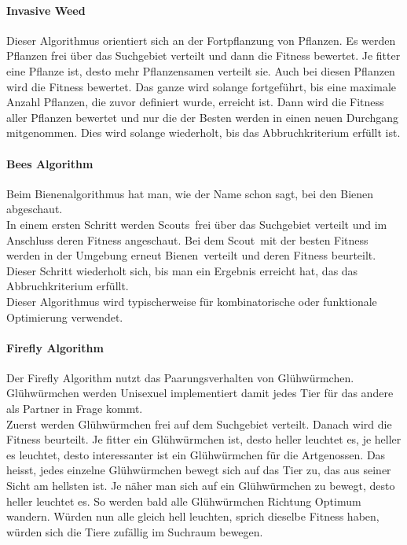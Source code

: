 		\paragraph{Invasive Weed}
		$\;$ \\
		Dieser Algorithmus orientiert sich an der Fortpflanzung von Pflanzen. Es werden Pflanzen frei über das Suchgebiet verteilt und dann die Fitness bewertet. Je fitter eine Pflanze ist, desto mehr Pflanzensamen verteilt sie. Auch bei diesen Pflanzen wird die Fitness bewertet. Das ganze wird solange fortgeführt, bis eine maximale Anzahl Pflanzen, die zuvor definiert wurde, erreicht ist. Dann wird die Fitness aller Pflanzen bewertet und nur die der Besten werden in einen neuen Durchgang mitgenommen. Dies wird solange wiederholt, bis das Abbruchkriterium erfüllt ist.
				
		
		\paragraph{Bees Algorithm}
		$\;$ \\
		Beim Bienenalgorithmus hat man, wie der Name schon sagt, bei den Bienen abgeschaut.\\
		In einem ersten Schritt werden \textacutedbl Scouts\textacutedbl \ frei über das Suchgebiet verteilt und im Anschluss deren Fitness angeschaut. Bei dem \textacutedbl Scout\textacutedbl \ mit der besten Fitness werden in der Umgebung erneut \textacutedbl Bienen\textacutedbl \ verteilt und deren Fitness beurteilt. Dieser Schritt wiederholt sich, bis man ein Ergebnis erreicht hat, das das Abbruchkriterium erfüllt.\\Dieser Algorithmus wird typischerweise für kombinatorische oder funktionale Optimierung verwendet.
		
		\paragraph{Firefly Algorithm} 
		$\;$ \\
		Der Firefly Algorithm nutzt das Paarungsverhalten von Glühwürmchen. Glühwürmchen werden Unisexuel implementiert damit jedes Tier für das andere als Partner in Frage kommt. \\
		Zuerst werden Glühwürmchen frei auf dem Suchgebiet verteilt. Danach wird die Fitness beurteilt. Je fitter ein Glühwürmchen ist, desto heller leuchtet es, je heller es leuchtet, desto interessanter ist ein Glühwürmchen für die Artgenossen. Das heisst, jedes einzelne Glühwürmchen bewegt sich auf das Tier zu, das aus seiner Sicht am hellsten ist. Je näher man sich auf ein Glühwürmchen zu bewegt, desto heller leuchtet es. So werden bald alle Glühwürmchen Richtung Optimum wandern. Würden nun alle gleich hell leuchten, sprich dieselbe Fitness haben, würden sich die Tiere zufällig im Suchraum bewegen.
		
		